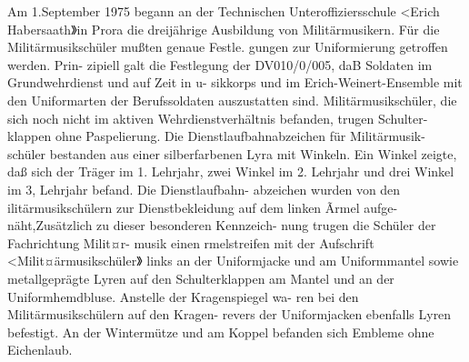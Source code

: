 

Am 1.September 1975 begann an der Technischen
Unteroffiziersschule <Erich Habersaath》in Prora
die dreijährige Ausbildung von Militärmusikern.
Für die Militärmusikschüler mußten genaue Festle.
gungen zur Uniformierung getroffen werden. Prin-
zipiell galt die Festlegung der DV010/0/005, daB
Soldaten im Grundwehrdienst und auf Zeit in u-
sikkorps und im Erich-Weinert-Ensemble mit den
Uniformarten der Berufssoldaten auszustatten sind.
Militärmusikschüler, die sich noch nicht im aktiven
Wehrdienstverhältnis befanden, trugen Schulter-
klappen ohne Paspelierung.
Die Dienstlaufbahnabzeichen für Militärmusik-
schüler bestanden aus einer silberfarbenen Lyra mit
Winkeln. Ein Winkel zeigte, daß sich der Träger im
1. Lehrjahr, zwei Winkel im 2. Lehrjahr und drei
Winkel im 3, Lehrjahr befand. Die Dienstlaufbahn-
abzeichen wurden von den ilitärmusikschülern zur Dienstbekleidung auf dem linken Ãrmel aufge-
näht,Zusätzlich zu dieser besonderen Kennzeich-
nung trugen die Schüler der Fachrichtung Milit¤r-
musik einen rmelstreifen mit der Aufschrift
<Milit¤ärmusikschüler》 links an der Uniformjacke
und am Uniformmantel sowie metallgeprägte Lyren
auf den Schulterklappen am Mantel und an der
Uniformhemdbluse. Anstelle der Kragenspiegel wa-
ren bei den Militärmusikschülern auf den Kragen-
revers der Uniformjacken ebenfalls Lyren befestigt.
An der Wintermütze und am Koppel befanden sich
Embleme ohne Eichenlaub.